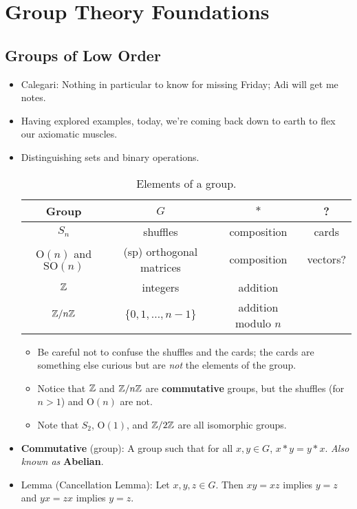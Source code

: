 \documentclass[../notes.tex]{subfiles}
\begin{document}
\chapter{Group Theory Foundations}
\section{Groups of Low Order}
\begin{itemize}
    \item {}Calegari: Nothing in particular to know for missing Friday; Adi will get me notes.
    \item Having explored examples, today, we're coming back down to earth to flex our axiomatic muscles.
    \item Distinguishing sets and binary operations.
    \begin{table}[h!]
        \centering
        \small
        \renewcommand{\arraystretch}{1.2}
        \begin{tabular}{c|c|c|c}
            Group & $G$ & $*$ & ?\\
            \hline
            $S_n$ & shuffles & composition & cards\\
            $\text{O}(n)$ and $\text{SO}(n)$ & (sp) orthogonal matrices & composition & vectors?\\
            $\mathbb{Z}$ & integers & addition\\
            $\mathbb{Z}/n\mathbb{Z}$ & $\{0,1,\dots,n-1\}$ & addition modulo $n$
        \end{tabular}
        \caption{Elements of a group.}
        \label{tab:setsBinaryops}
    \end{table}
    \begin{itemize}
        \item Be careful not to confuse the shuffles and the cards; the cards are something else curious but are \emph{not} the elements of the group.
        \item Notice that $\mathbb{Z}$ and $\mathbb{Z}/n\mathbb{Z}$ are \textbf{commutative} groups, but the shuffles (for $n>1$) and $\text{O}(n)$ are not.
        \item Note that $S_2$, $\text{O}(1)$, and $\mathbb{Z}/2\mathbb{Z}$ are all isomorphic groups.
    \end{itemize}
    \item \textbf{Commutative} (group): A group such that for all $x,y\in G$, $x*y=y*x$. \emph{Also known as} \textbf{Abelian}.
    \item Lemma (Cancellation Lemma): Let $x,y,z\in G$. Then $xy=xz$ implies $y=z$ and $yx=zx$ implies $y=z$.

\end{itemize}
\end{document}
